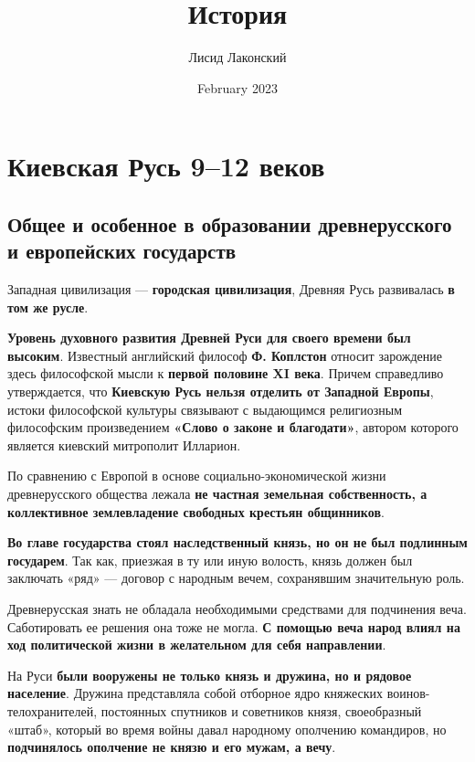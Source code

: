 \documentclass{article}
\title{История}
\author{Лисид Лаконский}
\date{February 2023}
\begin{document}
\raggedright

\maketitle
\tableofcontents
\pagebreak

\section{Киевская Русь 9–12 веков}

\subsection{Общее и особенное в образовании древнерусского и европейских государств}

Западная цивилизация — \textbf{городская цивилизация}, Древняя Русь развивалась \textbf{в том же русле}.

\textbf{Уровень духовного развития Древней Руси для своего времени был высоким}. Известный английский философ \textbf{Ф. Коплстон} относит зарождение здесь философской мысли к \textbf{первой половине XI века}. Причем справедливо утверждается, что \textbf{Киевскую Русь нельзя отделить от Западной Европы}, истоки философской культуры связывают с выдающимся религиозным философским произведением \textbf{«Слово о законе и благодати»}, автором которого является киевский митрополит Илларион.

\hfill

По сравнению с Европой в основе социально-экономической жизни древнерусского общества лежала \textbf{не частная земельная собственность, а коллективное землевладение свободных крестьян общинников}.

\textbf{Во главе государства стоял наследственный князь, но он не был подлинным государем}. Так как, приезжая в ту или иную волость, князь должен был заключать «ряд» — договор с народным вечем, сохранявшим значительную роль.

Древнерусская знать не обладала необходимыми средствами для подчинения веча. Саботировать ее решения она тоже не могла. \textbf{С помощью веча народ влиял на ход политической жизни в желательном для себя направлении}.

 \hfill

 На Руси \textbf{были вооружены не только князь и дружина, но и рядовое население}. Дружина представляла собой отборное ядро княжеских воинов-телохранителей, постоянных спутников и советников князя, своеобразный «штаб», который во время войны давал народному ополчению командиров, но \textbf{подчинялось ополчение не князю и его мужам, а вечу}.
\end{document}
